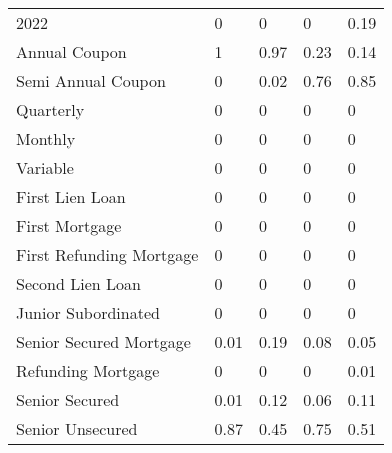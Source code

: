 \begin{table}[]
\begin{tabular}{lllll}
2022 & \cellcolor[HTML]{FCFCFF}0 & \cellcolor[HTML]{FCFCFF}0 & \cellcolor[HTML]{FCFCFF}0 & \cellcolor[HTML]{DFF1E6}0.19 \\
Annual Coupon & \cellcolor[HTML]{63BE7B}1 & \cellcolor[HTML]{68C07F}0.97 & \cellcolor[HTML]{D9EEE1}0.23 & \cellcolor[HTML]{E7F4ED}0.14 \\
Semi Annual   Coupon & \cellcolor[HTML]{FCFCFF}0 & \cellcolor[HTML]{F9FBFD}0.02 & \cellcolor[HTML]{88CD9B}0.76 & \cellcolor[HTML]{7AC88F}0.85 \\
Quarterly & \cellcolor[HTML]{FCFCFF}0 & \cellcolor[HTML]{FCFCFF}0 & \cellcolor[HTML]{FCFCFF}0 & \cellcolor[HTML]{FCFCFF}0 \\
Monthly & \cellcolor[HTML]{FCFCFF}0 & \cellcolor[HTML]{FCFCFF}0 & \cellcolor[HTML]{FCFCFF}0 & \cellcolor[HTML]{FCFCFF}0 \\
Variable & \cellcolor[HTML]{FCFCFF}0 & \cellcolor[HTML]{FCFCFF}0 & \cellcolor[HTML]{FCFCFF}0 & \cellcolor[HTML]{FCFCFF}0 \\
First Lien Loan & \cellcolor[HTML]{FCFCFF}0 & \cellcolor[HTML]{FCFCFF}0 & \cellcolor[HTML]{FCFCFF}0 & \cellcolor[HTML]{FCFCFF}0 \\
First Mortgage & \cellcolor[HTML]{FCFCFF}0 & \cellcolor[HTML]{FCFCFF}0 & \cellcolor[HTML]{FCFCFF}0 & \cellcolor[HTML]{FCFCFF}0 \\
First   Refunding Mortgage & \cellcolor[HTML]{FCFCFF}0 & \cellcolor[HTML]{FCFCFF}0 & \cellcolor[HTML]{FCFCFF}0 & \cellcolor[HTML]{FCFCFF}0 \\
Second Lien Loan & \cellcolor[HTML]{FCFCFF}0 & \cellcolor[HTML]{FCFCFF}0 & \cellcolor[HTML]{FCFCFF}0 & \cellcolor[HTML]{FCFCFF}0 \\
Junior   Subordinated & \cellcolor[HTML]{FCFCFF}0 & \cellcolor[HTML]{FCFCFF}0 & \cellcolor[HTML]{FCFCFF}0 & \cellcolor[HTML]{FCFCFF}0 \\
Senior   Secured Mortgage & \cellcolor[HTML]{FBFCFE}0.01 & \cellcolor[HTML]{DFF1E6}0.19 & \cellcolor[HTML]{F0F8F5}0.08 & \cellcolor[HTML]{F5F9F9}0.05 \\
Refunding   Mortgage & \cellcolor[HTML]{FCFCFF}0 & \cellcolor[HTML]{FCFCFF}0 & \cellcolor[HTML]{FCFCFF}0 & \cellcolor[HTML]{FBFCFE}0.01 \\
Senior Secured & \cellcolor[HTML]{FBFCFE}0.01 & \cellcolor[HTML]{EAF5F0}0.12 & \cellcolor[HTML]{F3F9F8}0.06 & \cellcolor[HTML]{ECF6F1}0.11 \\
Senior Unsecured & \cellcolor[HTML]{77C78D}0.87 & \cellcolor[HTML]{B8E1C4}0.45 & \cellcolor[HTML]{8ACE9C}0.75 & \cellcolor[HTML]{AEDDBC}0.51 \\

\end{tabular}
\end{table}
